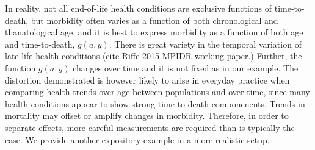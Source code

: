 \documentclass[11pt,oneside,a4paper]{article} %
\begin{document}
In reality, not all end-of-life health conditions are exclusive functions of
time-to-death, but morbidity often varies as a function of
both chronological and thanatological age, and it is best to express morbidity
as a function of both age and time-to-death, $g(a,y)$. There is great variety in
the temporal variation of late-life health conditions (cite Riffe 2015 MPIDR
working paper.) Further, the function $g(a,y)$ changes over time and it is not
fixed as in our example. The distortion demonstrated is however likely to arise
in everyday practice when comparing health trends over age between populations
and over time, since many health conditions appear to show strong time-to-death
componenents. Trends in mortality may offset or amplify changes in morbidity.
Therefore, in order to separate effects, more careful measurements are required
than is typically the case. We provide another expository example in a more
realistic setup.
 
\end{document}
